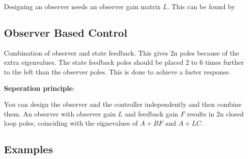 Designing an observer needs an observer gain matrix $L$. This can be found by




\subsection{Observer Based Control}

Combination of observer and state feedback.
This gives 2n poles because of the extra eigenvalues.
The state feedback poles should be placed 2 to 6 times further
to the left than the observer poles. This is done to achieve a faster response.

\textbf{Seperation principle}:

You can design the observer and the controller independently and then combine them.
An observer with observer gain $L$ and feedback gain $F$ results in 2n closed loop poles,
coinciding with the eignevalues of $A+BF$ and $A+LC$.



\subsection{Examples}
